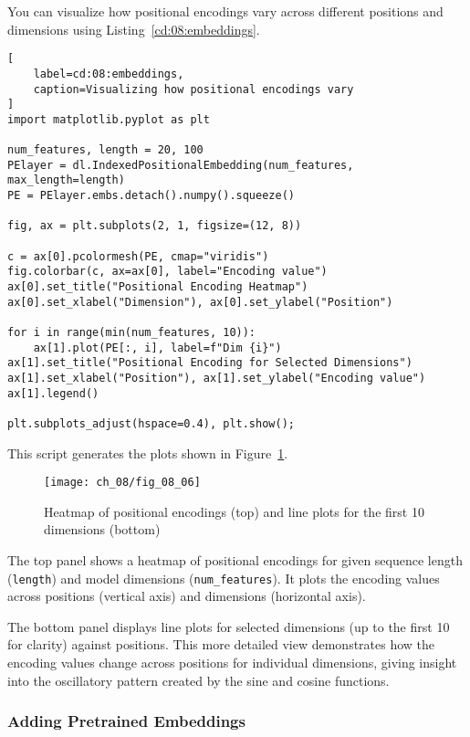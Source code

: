You can visualize how positional encodings vary across different positions and dimensions using Listing~\ref{cd:08:embeddings}.
\begin{lstlisting}[
    label=cd:08:embeddings,
    caption=Visualizing how positional encodings vary
]
import matplotlib.pyplot as plt

num_features, length = 20, 100
PElayer = dl.IndexedPositionalEmbedding(num_features, max_length=length)
PE = PElayer.embs.detach().numpy().squeeze()

fig, ax = plt.subplots(2, 1, figsize=(12, 8))

c = ax[0].pcolormesh(PE, cmap="viridis")
fig.colorbar(c, ax=ax[0], label="Encoding value")
ax[0].set_title("Positional Encoding Heatmap")
ax[0].set_xlabel("Dimension"), ax[0].set_ylabel("Position")

for i in range(min(num_features, 10)):
    ax[1].plot(PE[:, i], label=f"Dim {i}")
ax[1].set_title("Positional Encoding for Selected Dimensions")
ax[1].set_xlabel("Position"), ax[1].set_ylabel("Encoding value")
ax[1].legend()

plt.subplots_adjust(hspace=0.4), plt.show();
\end{lstlisting}
This script generates the plots shown in Figure~\ref{fig:08:embeddings}.

\begin{figure}[H]
    \texttt{[image: ch\_08/fig\_08\_06]} %
    \caption{Heatmap of positional encodings (top) and line plots for the first 10 dimensions (bottom)}
    \label{fig:08:embeddings}
\end{figure}

The top panel shows a heatmap of positional encodings for given sequence length (\lstinline{length}) and model dimensions (\lstinline{num_features}). It plots the encoding values across positions (vertical axis) and dimensions (horizontal axis).

The bottom panel displays line plots for selected dimensions (up to the first 10 for clarity) against positions. This more detailed view demonstrates how the encoding values change across positions for individual dimensions, giving insight into the oscillatory pattern created by the sine and cosine functions.

\subsubsection{Adding Pretrained Embeddings}
\fi


